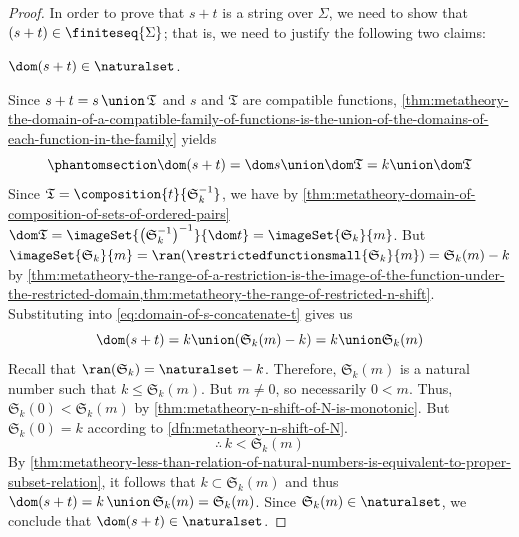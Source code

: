 \begin{proof}
    \vspace{0.3cm}
    \noindent
    In order to prove that \( s + t \) is a string over \( \Sigma \), we need to show that \( \mleft( s + t \mright) \in \finiteseq{\Sigma} \);
    that is, we need to justify the following two claims:
    \begin{claim}
         \label{claim:domain-of-s-concatenate-t-is-a-natural-number}
        \( \dom \mleft( s + t \mright) \in \naturalset \).
    \end{claim}
    \noindent
    Since \( s + t = s \,{\union}\, \mathfrak{T} \) and \( s \) and \( \mathfrak{T} \) are compatible functions,
    \cref{thm:metatheory-the-domain-of-a-compatible-family-of-functions-is-the-union-of-the-domains-of-each-function-in-the-family}
    yields
    \begin{equation}
        \phantomsection \label{eq:domain-of-s-concatenate-t}
        \dom \mleft( s + t \mright) = \dom s \union \dom \mathfrak{T} = k \union \dom \mathfrak{T}
    \end{equation}
    Since \( \mathfrak{T} = \composition{t}{\mathfrak{S}^{-1}_{k}} \), we have by \cref{thm:metatheory-domain-of-composition-of-sets-of-ordered-pairs}
    \( \dom \mathfrak{T} = \imageSet{\mleft( \mathfrak{S}^{-1}_{k} \mright)^{-1}}{\dom t} = \imageSet{\mathfrak{S}_{k}}{m} \).
    But \( \imageSet{\mathfrak{S}_{k}}{m} = \ran \mleft( \restrictedfunctionsmall{ \mathfrak{S}_{k} }{m} \mright) = \mathfrak{S}_{k}(m) - k \)
    by \cref{thm:metatheory-the-range-of-a-restriction-is-the-image-of-the-function-under-the-restricted-domain,thm:metatheory-the-range-of-restricted-n-shift}.
    Substituting into \eqref{eq:domain-of-s-concatenate-t} gives us
    \begin{equation*}
        \dom \mleft( s + t \mright) = k \union \mleft( \mathfrak{S}_{k}(m) - k \mright) = k \union \mathfrak{S}_{k}(m)
    \end{equation*}
    Recall that \( \ran \mleft( \mathfrak{S}_{k} \mright) = \naturalset - k \).
    Therefore, \( \mathfrak{S}_{k}(m) \) is a natural number such that \( k \leq \mathfrak{S}_{k}(m) \).
    But \( m \neq 0 \), so necessarily \( 0 < m \).
    Thus, \( \mathfrak{S}_{k}(0) < \mathfrak{S}_{k}(m) \) by \cref{thm:metatheory-n-shift-of-N-is-monotonic}.
    But \( \mathfrak{S}_{k}(0) = k \) according to \cref{dfn:metatheory-n-shift-of-N}.
    \begin{equation*}
        \therefore \, k < \mathfrak{S}_{k}(m)
    \end{equation*}
    By \cref{thm:metatheory-less-than-relation-of-natural-numbers-is-equivalent-to-proper-subset-relation}, it follows that
    \( k \subset \mathfrak{S}_{k}(m) \) and thus \( \dom \mleft( s + t \mright) = k \,{\union}\, \mathfrak{S}_{k}(m) = \mathfrak{S}_{k}(m)  \).
    Since \( \mathfrak{S}_{k}(m) \in \naturalset \), we conclude that \( \dom \mleft( s + t \mright) \in \naturalset \).


\end{proof}
